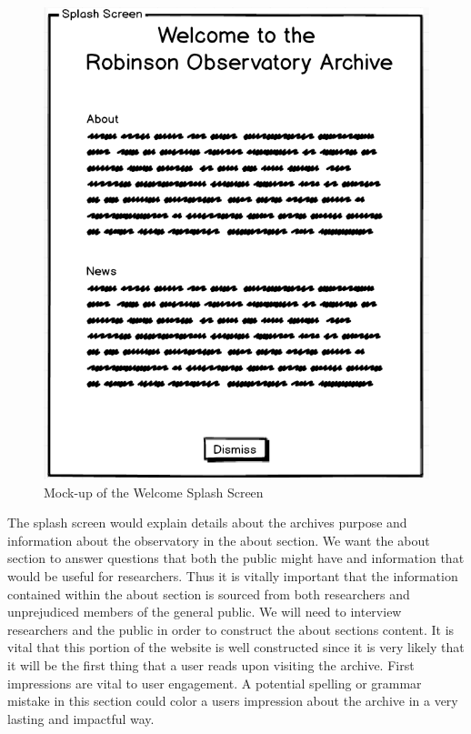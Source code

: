 \documentclass[12pt]{article}
\begin{document}
\begin{figure}[h]
	\centering
	\includegraphics[scale=0.5]{splash_screen_mockup}
	\caption{Mock-up of the Welcome Splash Screen}
	\label{fig:splashscreenmockup}
\end{figure}

The splash screen would explain details about the archives purpose and information about the observatory in the about section. We want the about section to answer questions that both the public might have and information that would be useful for researchers. Thus it is vitally important that the information contained within the about section is sourced from both researchers and unprejudiced members of the general public. We will need to interview researchers and the public in order to construct the about sections content. It is vital that this portion of the website is well constructed since it is very likely that it will be the first thing that a user reads upon visiting the archive. First impressions are vital to user engagement. A potential spelling or grammar mistake in this section could color a users impression about the archive in a very lasting and impactful way.
\end{document}
